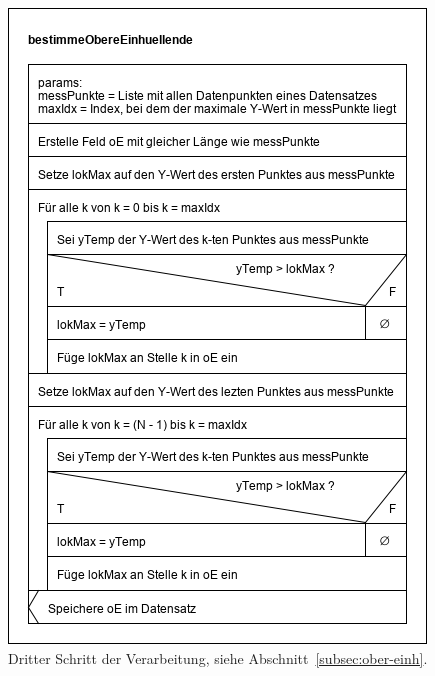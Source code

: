 \begin{figure}[htb]
    \centering
    \includegraphics[width=0.7\linewidth]{images/bestimmeObereEinhuellende}
    \caption{
        Dritter Schritt der Verarbeitung, siehe Abschnitt~\ref{subsec:ober-einh}.
    }
    \label{fig:obere-ein-strukto}
\end{figure}

